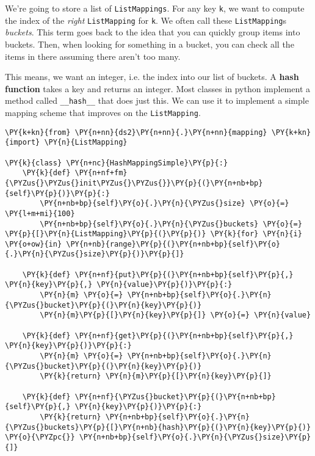 We're going to store a list of \texttt{ListMappings}.
For any key \texttt{k},  we want to compute the index of the \emph{right} \texttt{ListMapping} for \texttt{k}.  We often call these \texttt{ListMapping}s \emph{buckets}.  This term goes back to the idea that you can quickly group items into buckets.  Then, when looking for something in a bucket, you can check all the items in there assuming there aren’t too many.


This means, we want an integer, i.e. the index into our list of buckets.  A \textbf{hash function} takes a key and returns an integer.  Most classes in python implement a method called \texttt{\_\_hash\_\_} that does just this.  We can use it to implement a simple mapping scheme that improves on the \texttt{ListMapping}.  

\begin{Verbatim}[commandchars=\\\{\}]
\PY{k+kn}{from} \PY{n+nn}{ds2}\PY{n+nn}{.}\PY{n+nn}{mapping} \PY{k+kn}{import} \PY{n}{ListMapping}

\PY{k}{class} \PY{n+nc}{HashMappingSimple}\PY{p}{:}
    \PY{k}{def} \PY{n+nf+fm}{\PYZus{}\PYZus{}init\PYZus{}\PYZus{}}\PY{p}{(}\PY{n+nb+bp}{self}\PY{p}{)}\PY{p}{:}
        \PY{n+nb+bp}{self}\PY{o}{.}\PY{n}{\PYZus{}size} \PY{o}{=} \PY{l+m+mi}{100}
        \PY{n+nb+bp}{self}\PY{o}{.}\PY{n}{\PYZus{}buckets} \PY{o}{=} \PY{p}{[}\PY{n}{ListMapping}\PY{p}{(}\PY{p}{)} \PY{k}{for} \PY{n}{i} \PY{o+ow}{in} \PY{n+nb}{range}\PY{p}{(}\PY{n+nb+bp}{self}\PY{o}{.}\PY{n}{\PYZus{}size}\PY{p}{)}\PY{p}{]}

    \PY{k}{def} \PY{n+nf}{put}\PY{p}{(}\PY{n+nb+bp}{self}\PY{p}{,} \PY{n}{key}\PY{p}{,} \PY{n}{value}\PY{p}{)}\PY{p}{:}
        \PY{n}{m} \PY{o}{=} \PY{n+nb+bp}{self}\PY{o}{.}\PY{n}{\PYZus{}bucket}\PY{p}{(}\PY{n}{key}\PY{p}{)}
        \PY{n}{m}\PY{p}{[}\PY{n}{key}\PY{p}{]} \PY{o}{=} \PY{n}{value}

    \PY{k}{def} \PY{n+nf}{get}\PY{p}{(}\PY{n+nb+bp}{self}\PY{p}{,} \PY{n}{key}\PY{p}{)}\PY{p}{:}
        \PY{n}{m} \PY{o}{=} \PY{n+nb+bp}{self}\PY{o}{.}\PY{n}{\PYZus{}bucket}\PY{p}{(}\PY{n}{key}\PY{p}{)}
        \PY{k}{return} \PY{n}{m}\PY{p}{[}\PY{n}{key}\PY{p}{]}

    \PY{k}{def} \PY{n+nf}{\PYZus{}bucket}\PY{p}{(}\PY{n+nb+bp}{self}\PY{p}{,} \PY{n}{key}\PY{p}{)}\PY{p}{:}
        \PY{k}{return} \PY{n+nb+bp}{self}\PY{o}{.}\PY{n}{\PYZus{}buckets}\PY{p}{[}\PY{n+nb}{hash}\PY{p}{(}\PY{n}{key}\PY{p}{)} \PY{o}{\PYZpc{}} \PY{n+nb+bp}{self}\PY{o}{.}\PY{n}{\PYZus{}size}\PY{p}{]}
\end{Verbatim}



